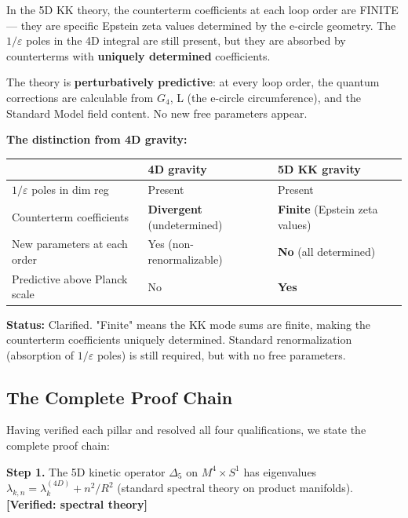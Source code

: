 \documentclass[aps,prd,preprint,superscriptaddress,longbibliography,floatfix]{revtex4-2}
\theoremstyle{remark}
\begin{document}
In the 5D KK theory, the counterterm coefficients at each loop order are FINITE --- they are specific Epstein zeta values determined by the e-circle geometry. The $1/\varepsilon$ poles in the 4D integral are still present, but they are absorbed by counterterms with \textbf{uniquely determined} coefficients.

The theory is \textbf{perturbatively predictive}: at every loop order, the quantum corrections are calculable from $G_{4}$, L (the e-circle circumference), and the Standard Model field content. No new free parameters appear.

\textbf{The distinction from 4D gravity:}


\begin{table}[H]
\begin{ruledtabular}
\begin{tabular}{p{5.0cm}p{5.0cm}p{5.0cm}}
 & 4D gravity & 5D KK gravity \\
\hline
$1/\varepsilon$ poles in dim reg & Present & Present \\
Counterterm coefficients & \textbf{Divergent} (undetermined) & \textbf{Finite} (Epstein zeta values) \\
New parameters at each order & Yes (non-renormalizable) & \textbf{No} (all determined) \\
Predictive above Planck scale & No & \textbf{Yes} \\
\end{tabular}
\end{ruledtabular}
\end{table}

\textbf{Status:} Clarified. "Finite" means the KK mode sums are finite, making the counterterm coefficients uniquely determined. Standard renormalization (absorption of $1/\varepsilon$ poles) is still required, but with no free parameters.



\subsection{The Complete Proof Chain}

Having verified each pillar and resolved all four qualifications, we state the complete proof chain:

\textbf{Step 1.} The 5D kinetic operator $\Delta_{5}$ on $M^{4} \times S^{1}$ has eigenvalues $\lambda_{k,n} = \lambda_k^{(4D)} + n^{2}/R^{2}$ (standard spectral theory on product manifolds). \textbf{[Verified: spectral theory]}
\end{document}
